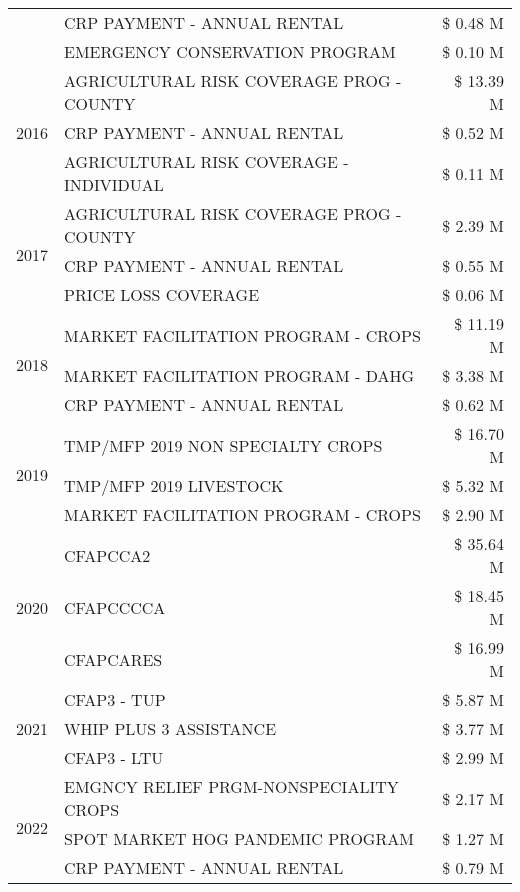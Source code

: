 \begin{tabular}{llr}
 & CRP PAYMENT - ANNUAL RENTAL & \$ 0.48 M \\
 & EMERGENCY CONSERVATION PROGRAM & \$ 0.10 M \\
\cline{1-3}
\multirow[t]{3}{*}{2016} & AGRICULTURAL RISK COVERAGE PROG - COUNTY & \$ 13.39 M \\
 & CRP PAYMENT - ANNUAL RENTAL & \$ 0.52 M \\
 & AGRICULTURAL RISK COVERAGE - INDIVIDUAL & \$ 0.11 M \\
\cline{1-3}
\multirow[t]{3}{*}{2017} & AGRICULTURAL RISK COVERAGE PROG - COUNTY & \$ 2.39 M \\
 & CRP PAYMENT - ANNUAL RENTAL & \$ 0.55 M \\
 & PRICE LOSS COVERAGE & \$ 0.06 M \\
\cline{1-3}
\multirow[t]{3}{*}{2018} & MARKET FACILITATION PROGRAM - CROPS & \$ 11.19 M \\
 & MARKET FACILITATION PROGRAM - DAHG & \$ 3.38 M \\
 & CRP PAYMENT - ANNUAL RENTAL & \$ 0.62 M \\
\cline{1-3}
\multirow[t]{3}{*}{2019} & TMP/MFP 2019 NON SPECIALTY CROPS & \$ 16.70 M \\
 & TMP/MFP 2019 LIVESTOCK & \$ 5.32 M \\
 & MARKET FACILITATION PROGRAM - CROPS & \$ 2.90 M \\
\cline{1-3}
\multirow[t]{3}{*}{2020} & CFAPCCA2 & \$ 35.64 M \\
 & CFAPCCCCA & \$ 18.45 M \\
 & CFAPCARES & \$ 16.99 M \\
\cline{1-3}
\multirow[t]{3}{*}{2021} & CFAP3 - TUP & \$ 5.87 M \\
 & WHIP PLUS 3 ASSISTANCE & \$ 3.77 M \\
 & CFAP3 - LTU & \$ 2.99 M \\
\cline{1-3}
\multirow[t]{3}{*}{2022} & EMGNCY RELIEF PRGM-NONSPECIALITY CROPS & \$ 2.17 M \\
 & SPOT MARKET HOG PANDEMIC PROGRAM & \$ 1.27 M \\
 & CRP PAYMENT - ANNUAL RENTAL & \$ 0.79 M \\
\cline{1-3}
\bottomrule
\end{tabular}
